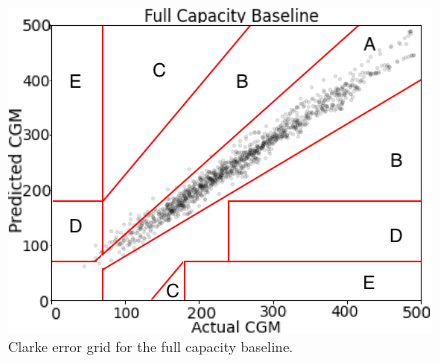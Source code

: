 \documentclass[letterpaper]{article}
\begin{document}
\begin{figure}[t]
 \centering 
 \hspace*{-.1cm} \includegraphics[height=2.3 in]{SB.png}
\caption{Clarke error grid for the full capacity baseline. }\label{fig:ceg2}
\end{figure}
\end{document}
